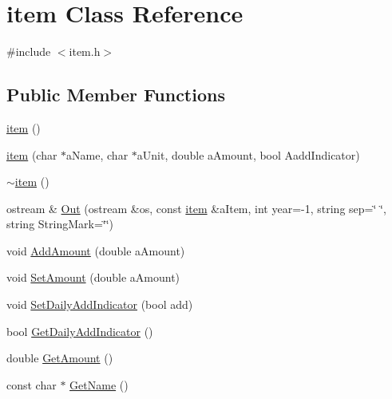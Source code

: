 \hypertarget{classitem}{
\section{item Class Reference}
\label{classitem}
}


{\ttfamily \#include $<$item.h$>$}\subsection*{Public Member Functions}
\begin{DoxyCompactItemize}
\item 
\hyperlink{classitem_a344fbf6e3db0d59e0c8ac75cd42ee144}{item} ()
\item 
\hyperlink{classitem_aab5a108ade3f674bc49cb1f1801eacb0}{item} (char $\ast$aName, char $\ast$aUnit, double aAmount, bool AaddIndicator)
\item 
\hyperlink{classitem_ae1792174ea9d664d6413f5ad0de38d74}{$\sim$item} ()
\item 
ostream \& \hyperlink{classitem_a68fcb42c6712e5eb6fd73b7cddefbd93}{Out} (ostream \&os, const \hyperlink{classitem}{item} \&aItem, int year=-\/1, string sep=\char`\"{} \char`\"{}, string StringMark=\char`\"{}\char`\"{})
\item 
void \hyperlink{classitem_a8765b474f72992061b8da66069561f58}{AddAmount} (double aAmount)
\item 
void \hyperlink{classitem_a13510028580153ac47bbf573883c99f4}{SetAmount} (double aAmount)
\item 
void \hyperlink{classitem_a6356f02f08d20f2c06ad0fd5f0432e01}{SetDailyAddIndicator} (bool add)
\item 
bool \hyperlink{classitem_a5b7d72aefcf7ee42674595f42b6d13cb}{GetDailyAddIndicator} ()
\item 
double \hyperlink{classitem_af896af977922b815bf0c0804730efa00}{GetAmount} ()
\item 
const char $\ast$ \hyperlink{classitem_abac2736ce9cdac104f0fb088c8a8b12e}{GetName} ()
\end{DoxyCompactItemize}


